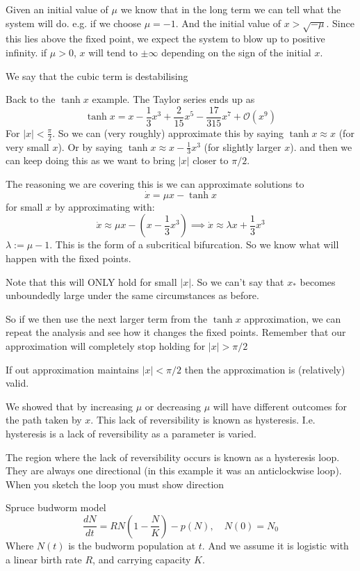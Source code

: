 \documentclass{/home/janmebows/Documents/LatexTemplates/myassignment}
\begin{document}
Given an initial value of $\mu$ we know that in the long term we can tell what the system will do. e.g. if we choose $\mu = -1$. And the initial value of $x > \sqrt{-\mu}$. Since this lies above the fixed point, we expect the system to blow up to positive infinity. if $\mu > 0$, $x$ will tend to $\pm \infty$ depending on the sign of the initial $x$.

We say that the cubic term is destabilising

Back to the $\tanh x$ example. The Taylor series ends up as
\[\tanh x = x - \frac13 x^3 + \frac2{15} x^5 - \frac{17}{315} x^7 + \mathcal{O}(x^9)\]
For $|x| < \frac{\pi}{2}$.
So we can (very roughly) approximate this by saying $\tanh x \approx x$ (for very small $x$). Or by saying
$\tanh x \approx x - \frac13 x^3$ (for slightly larger $x$). and then we can keep doing this as we want to bring $|x|$ closer to $\pi/2$.

The reasoning we are covering this is we can approximate solutions to
\[\dot{x} = \mu x - \tanh x\]
for small $x$ by approximating with:
\[\dot{x} \approx \mu x - (x - \frac13 x^3) \implies \dot{x} \approx \lambda x + \frac13 x^3\]
$\lambda := \mu -1$. This is the form of a subcritical bifurcation. So we know what will happen with the fixed points. 

Note that this will ONLY hold for small $|x|$. So we can't say that $x_*$ becomes unboundedly large under the same circumstances as before.

So if we then use the next larger term from the $\tanh x$ approximation, we can repeat the analysis and see how it changes the fixed points.
Remember that our approximation will completely stop holding for $|x| > \pi/2$

If out approximation maintains $|x| < \pi /2$ then the approximation is (relatively) valid.


We showed that by increasing $\mu$ or decreasing $\mu$ will have different outcomes for the path taken by $x$. This lack of reversibility is known as hysteresis. I.e. hysteresis is a lack of reversibility as a parameter is varied.



The region where the lack of reversibility occurs is known as a hysteresis loop. They are always one directional (in this example it was an anticlockwise loop). When you sketch the loop you must show direction


Spruce budworm model
\[\frac{dN}{dt} = RN(1 - \frac{N}{K}) - p(N), \quad N(0) = N_0\]
Where $N(t)$ is the budworm population at $t$. And we assume it is logistic with a linear birth rate $R$, and carrying capacity $K$.
\end{document}
